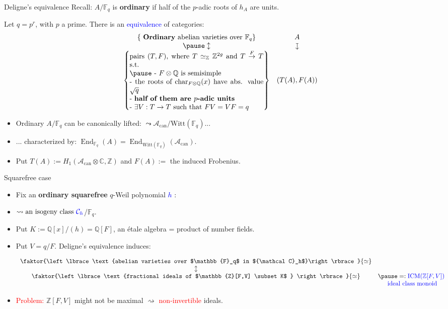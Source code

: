 \documentclass[usenames,dvipsnames]{beamer}
\def\Q{\mathbb{Q}}
\def\Z{\mathbb{Z}}
\def\C{\mathbb{C}}
\def\F{\mathbb{F}}
\DeclareMathOperator{\Char}{char}
\DeclareMathOperator{\ICM}{ICM}
\DeclareMathOperator{\End}{End}
\newcommand{\cA}{{\mathcal A}}
\newcommand{\cC}{{\mathcal C}}
\newcommand{\downmapsto}{\rotatebox[origin=c]{-90}{$\large\mapsto$}\mkern2mu} %
\newcommand{\set}[1]{\left\lbrace#1\right\rbrace }
\newcommand{\red}[1]{\textcolor{red}{#1}}
\newcommand{\blue}[1]{\textcolor{blue}{#1}}
\begin{document}
\begin{frame}{ Deligne's equivalence }
	Recall: $A/\F_q$ is {\bf ordinary} if half of the $p$-adic roots of $h_A$ are units.
\pause
	\begin{theorem}
	Let $q=p^r$, with $p$ a prime.
	There is an \blue{equivalence} of categories:
	\[ \begin{array}{cc}
	\set{\text{ {\bf Ordinary} abelian varieties over } \F_q } 	& A \\
\pause
    \updownarrow											& \downmapsto \\
	\set{\parbox[p]{19em}{pairs $(T,F)$, where $T\simeq_\Z \Z^{2g}$ and $T\overset{F}{\to} T$ s.t.\\
\pause
	- $F\otimes \Q$ is semisimple\\
	- the roots of $\Char_{F\otimes\Q}(x)$ have abs. value $\sqrt{q}$\\
	- \textbf{half of them are $p$-adic units}\\
	- $\exists V:T\to T$ such that $FV=VF=q$
	}}	& (T(A),F(A))
	\end{array} \]
	\end{theorem}
\pause
	\begin{itemize}
	 \item Ordinary $A/\F_q$ can be canonically lifted: $\leadsto \cA_{\mathrm{can}}/\mathrm{Witt}(\F_q)$...
\pause
	 \item ... characterized by: $\End_{\F_q}(A) = \End_{\mathrm{Witt}(\F_q)}(\cA_{\mathrm{can}})$.
\pause
	 \item Put $T(A):=H_1(\cA_{\mathrm{can}}\otimes \C,\Z) $
\pause
	  and $F(A):=$ the induced Frobenius.
	\end{itemize}
\end{frame}

\begin{frame}{Squarefree case}
	\begin{itemize}
	\item Fix an \textbf{ordinary squarefree} $q$-Weil polynomial \blue{$h$} :
\pause  
    \item  $\rightsquigarrow \text{an isogeny class } \blue{\cC_h}$/$\F_q$.
\pause 
    \item Put $K := \Q[x]/(h)=\Q[F]$, an \'etale algebra = product of number fields.
\pause
	\item Put $V=q/F$. Deligne's equivalence induces:
\pause
			\begin{theorem}
			\[\begin{array}{cc}
			\faktor{\set{\text{abelian varieties over $\F_q$ in $\cC_h$}}}{\simeq} & \\
			\updownarrow & \\
			\faktor{\set{ \text{fractional ideals of $\Z[F,V] \subset K$ } }}{\simeq} &
\pause =:  \blue{\ICM(\Z[F,V])}\\ 
			& \blue{\text{ ideal class monoid} }
			  \end{array}\]
			\end{theorem}
\pause
    \item \red{Problem:} $\Z[F,V]$ might not be maximal $\rightsquigarrow $ \red{non-invertible} ideals.
	\end{itemize}
\end{frame}
\end{document}
